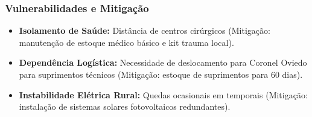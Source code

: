 \subsubsection{Vulnerabilidades e
Mitigação}

\begin{itemize}
\tightlist
\item
  \textbf{Isolamento de Saúde:} Distância de centros cirúrgicos
  (Mitigação: manutenção de estoque médico básico e kit trauma local).
\item
  \textbf{Dependência Logística:} Necessidade de deslocamento para
  Coronel Oviedo para suprimentos técnicos (Mitigação: estoque de
  suprimentos para 60 dias).
\item
  \textbf{Instabilidade Elétrica Rural:} Quedas ocasionais em temporais
  (Mitigação: instalação de sistemas solares fotovoltaicos redundantes).
\end{itemize}

